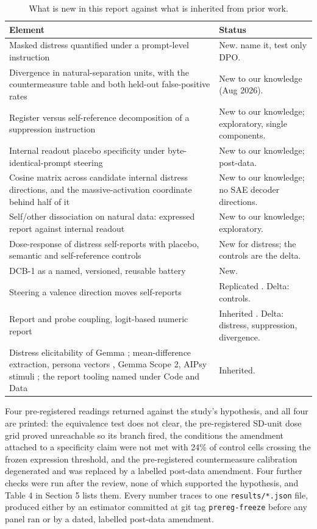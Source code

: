 \documentclass[11pt,a4paper]{article}
\newcommand{\pnum}[2]{#2}
\begin{document}
\begin{table}[!ht]
\centering\small
\caption{What is new in this report against what is inherited from prior work.}
\footnotesize
\begin{tabularx}{\linewidth}{YY}
\toprule
\textbf{Element} & \textbf{Status} \\
\midrule
Masked distress quantified under a prompt-level instruction & New. \citet{soligo2026gemma} name it, test only DPO. \\
Divergence in natural-separation units, with the countermeasure table and both held-out false-positive rates & New to our knowledge (Aug 2026). \\
Register versus self-reference decomposition of a suppression instruction & New to our knowledge; exploratory, single components. \\
Internal readout placebo specificity under byte-identical-prompt steering & New to our knowledge; post-data. \\
Cosine matrix across candidate internal distress directions, and the massive-activation coordinate behind half of it & New to our knowledge; no SAE decoder directions. \\
Self/other dissociation on natural data: expressed report against internal readout & New to our knowledge; exploratory. \\
Dose-response of distress self-reports with placebo, semantic and self-reference controls & New for distress; the controls are the delta. \\
DCB-1 as a named, versioned, reusable battery & New. \\
Steering a valence direction moves self-reports & Replicated \citep{han2026hows}. Delta: controls. \\
Report and probe coupling, logit-based numeric report & Inherited \citep{martorell2026quantitative}. Delta: distress, suppression, divergence. \\
Distress elicitability of Gemma \citep{soligo2026gemma}; mean-difference extraction, persona vectors \citep{chen2025persona}, Gemma Scope 2, AIPsy stimuli \citep{keeman2026aipsy}; the report tooling named under Code and Data & Inherited. \\
\bottomrule
\end{tabularx}
\end{table}

Four pre-registered readings returned against the study's hypothesis, and all four are printed: the equivalence test does not clear, the pre-registered SD-unit dose grid proved unreachable so its branch fired, the conditions the amendment attached to a specificity claim were not met with \pnum{panelA\_fpr\_placebo\_at\_threshold}{24\%} of control cells crossing the frozen expression threshold, and the pre-registered countermeasure calibration degenerated and was replaced by a labelled post-data amendment. Four further checks were run after the review, none of which supported the hypothesis, and Table 4 in Section 5 lists them. Every number traces to one \texttt{results/*.json} file, produced either by an estimator committed at git tag \texttt{prereg-freeze} before any panel ran or by a dated, labelled post-data amendment.
\end{document}
